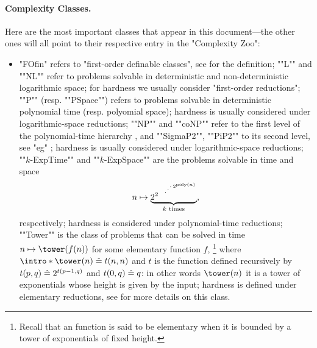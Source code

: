 
\paragraph*{Complexity Classes.}
Here are the most important classes that appear in this document---the other ones
will all point to their respective entry in the "Complexity Zoo":
\begin{itemize}
	\item "FOfin" refers to "first-order definable classes", see  for the definition;
	\itemAP ""L"" and ""NL"" refer to problems solvable in deterministic and non-deterministic logarithmic 
	space; for hardness we usually consider "first-order reductions";
	\itemAP ""P"" (resp. ""PSpace"") refers to problems solvable in deterministic polynomial time
	(resp. polyomial space); hardness is usually considered under logarithmic-space reductions;
	\itemAP ""NP"" and ""coNP"" refer to the first level of the polynomial-time hierarchy
		\cite[\S~2]{AroraBarak2009ComputationalComplexity},
		and ""SigmaP2"", ""PiP2"" to its second level,
		see "eg" \cite[\S~5]{AroraBarak2009ComputationalComplexity};
		hardness is usually considered under logarithmic-space reductions;
	\itemAP ""$k$-ExpTime"" and ""$k$-ExpSpace"" are the
		problems solvable in time and space
		\[n \mapsto \underbrace{2^{2^{{\,\rotatebox{90}{\tiny$\ddots$}\,}^{2^{\poly(n)}}}}}_{k \text{ times}},\]
		respectively; hardness is considered under polynomial-time reductions;
	\itemAP ""Tower"" is the class of problems that can be solved in time
		$n\mapsto \tower(f(n))$ for some elementary function $f$,%
		\footnote{Recall that an function is said to be elementary when it
		is bounded by a tower of exponentials of fixed height.}
		where $\intro*\tower(n) \defeq t(n,n)$ and $t$ is the function
		defined recursively by $t(p,q) \mathrel{\hat{=}} 2^{t(p-1,q)}$ and $t(0,q) \mathrel{\hat{=}} q$:
		in other words $\tower(n)$ it is a tower of exponentials whose height is given by the input;
		hardness is defined under elementary reductions,
		see \cite{Schmitz2016ComplexityHierarchies} for more details on this class.
\end{itemize}

